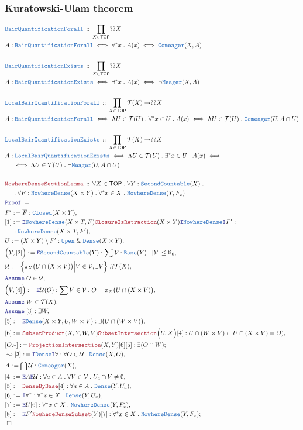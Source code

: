 \documentclass[12pt]{scrartcl}
\newcommand{\TYPE}[1]{\textcolor{NavyBlue}{\mathtt{#1}}}
\newcommand{\LOGIC}[1]{\textcolor{Blue}{\mathtt{#1}}}
\newcommand{\THM}[1]{\textcolor{Maroon}{\mathtt{#1}}}
\renewcommand{\.}{\; . \;}
\newcommand{\de}{: \kern 0.1pc =}
\newcommand{\Theorem}[2]{& \THM{#1} \, :: \, #2 \\ & \Proof = \\ }
\newcommand{\DeclareType}[2]{& \TYPE{#1} \, :: \, #2 \\}
\newcommand{\DefineNamedType}[4]{& #1 : \TYPE{#2} \iff #3 \iff #4 \\}
\newcommand{\NewLine}{\\ & \kern 1pc}
\newcommand{\Page}[1]{ \begin{align*} #1 \end{align*}   }
\renewcommand{\And}{\; \& \;}
\newcommand{\Intro}{\LOGIC{I}}
\newcommand{\Elim}{\LOGIC{E}}
\newcommand{\Say}[3]{& #1 \de #2 : #3, \\}
\newcommand{\Conclude}[3]{& #1 \de #2 : #3; \\}
\newcommand{\Derive}[3]{& \leadsto #1 \de #2 : #3, \\}
\newcommand{\Assume}[2]{& \LOGIC{Assume} \; #1 : #2, \\}
\newcommand{\AssumeIn}[2]{& \LOGIC{Assume} \; #1 \in #2, \\}
\newcommand{\QED}{\; \square}
\newcommand{\EndProof}{& \QED \\}
\newcommand{\Proof}{\LOGIC{Proof} \; }
\newcommand{\Open}{\TYPE{Open}}
\newcommand{\Dense}{\TYPE{Dense}}
\newcommand{\ND}{\TYPE{NowhereDense}}
\newcommand{\TOP}{\mathsf{TOP}}
\newcommand{\T}{\mathcal{T}}
\newcommand{\U}{\mathcal{U}}
\newcommand{\V}{\mathcal{V}}
\begin{document}
\subsubsection{Kuratowski-Ulam theorem}
\Page{
	\DeclareType{BairQuantificationForall}
	{
		\prod_{X \in \TOP} ??X	
	}
	\DefineNamedType{A}{BairQuantificationForall}
	{
		\forall^* x \. A(x)
	}
	{
		\TYPE{Comeager}(X,A)
	}
	\\
	\DeclareType{BairQuantificationExists}
	{
		\prod_{X \in \TOP} ??X	
	}
	\DefineNamedType{A}{BairQuantificationExists}
	{
		\exists^* x \. A(x)
	}
	{
		\neg\TYPE{Meager}(X,A)
	}
	\\
	\DeclareType{LocalBairQuantificationForall}
	{
		\prod_{X \in \TOP} \T(X) \to ??X	
	}
	\DefineNamedType{A}{BairQuantificationForall}
	{
		\Lambda U \in \T(U) \. \forall^* x \in U \. A(x)
	}
	{
		\Lambda U \in \T(U) \. \TYPE{Comeager}(U,A \cap U)
	}
	\\
	\DeclareType{LocalBairQuantificationExists}
	{
		\prod_{X \in \TOP} \T(X) \to ??X
	}
	\DefineNamedType{A}{LocalBairQuantificationExists}
	{
		\Lambda U \in \T(U) \. \exists^* x \in U \. A(x)
	}
	{
		\NewLine \iff		
		\Lambda U \in \T(U) \. \neg\TYPE{Meager}(U,A \cap U)
	}
	\\
	\Theorem{NowhereDenseSectionLemma}
	{
		\forall X \in  \TOP \.
		\forall Y : \TYPE{SecondCountable}(X) \. \NewLine \. 
		\forall F : \ND(X \times Y) \.
		\forall^* x \in X \. \ND(Y,F_x)
	}
	\Say{F'}{\overline{F}}{\TYPE{Closed}(X\times Y)}
	\Say{[1]}{
		\Elim \ND(X \times T, F) 
		\THM{ClosureIsRetraction}(X \times Y) 
		\Intro  \ND  \Intro F'
	}
	{
		\NewLine :		
		\ND(X\times T, F')
	}
	\Say{U}{(X \times Y) \setminus F'}
	{
		\Open \And \Dense(X \times Y)
	}
	\Say{\Big(\V,[2]\Big)}{\Elim \TYPE{SecondCountable}(Y)}
	{
		\sum \V : \TYPE{Base}(Y) \. |\V| \le \aleph_0 
	}
	\Say{\U}
	{
		\Big\{
				\pi_X \big(U \cap (X \times V)\big) 
		\Big|
			V \in \V, \exists V
		\Big\}
	}
	{
		?\T(X)
	}
	\AssumeIn{O}{\U}
	\Say{\Big(V,[4]\Big)}
	{
		\Elim \U(O)
	}
	{
		\sum V \in \V \. O = \pi_X\big(U \cap (X \times V)\big)
	}
	\AssumeIn{W}{\T(X)}
	\Assume{[3]}{\exists W}
	\Say{[5]}{\Elim \Dense( X \times Y,U, W \times V)}
	{
		\exists \big(U \cap (W \times V) \big)
	}
	\Say{[6]}{\THM{SubsetProduct}(X,Y,W,V) \THM{SubsetIntersection}\Big(U,X\Big)[4]}
	{
		U \cap (W \times V) \subset U \cap (X \times V) = O)
	}
	\Conclude{[O.*]}{\THM{ProjectionIntersection}(X,Y)[6][5]}
	{
		\exists(O \cap W)
	}
	\Derive{[3]}{\Intro \Dense \Intro \forall}
	{
		\forall O \in \U \. \Dense(X,O)
	}
	\Say{A}{\bigcap \U}{\TYPE{Comeager}(X)}
	\Say{[4]}{\Elim A \Elim \U}
	{
		\forall a \in A  \. 
		\forall V \in \V \.	
		U_a \cap V \neq \emptyset
	}
	\Say{[5]}{\THM{DenseByBase}[4]}
	{
		\forall a \in A \.
		\Dense(Y, U_a)
	}
	\Say{[6]}{\Intro \forall^*}
	{
		\forall^* x \in X \. \Dense(Y,U_x)
	}
	\Say{[7]}{\Elim U [6]}
	{
		\forall^* x \in X \.  \ND(Y,F'_x)
	}
	\Conclude{[8]}{\Elim F' \THM{NowhereDenseSubset}(Y)[7]}
	{
		\forall^* x \in X \.  \ND(Y,F_x)
	}
	\EndProof
}
\end{document}
